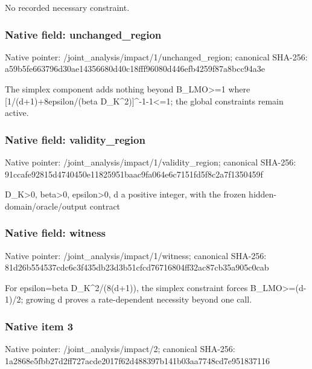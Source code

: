\documentclass[10pt,a4paper]{article}
\begin{document}
\begingroup\raggedright\sloppy No recorded necessary constraint.\par\endgroup

\subsubsection{Native field: unchanged\_\allowbreak{}region}
Native pointer: /joint\_\allowbreak{}analysis/impact/1/unchanged\_\allowbreak{}region; canonical SHA-256: a59b5fe663796d30ae14356680d40c18fff96080d446efb4259f87a8bcc94a3e

\begingroup\raggedright\sloppy The simplex component adds nothing beyond B\_\allowbreak{}LMO>=\allowbreak{}1 where [1/\allowbreak{}(d+1)+8epsilon/\allowbreak{}(beta D\_\allowbreak{}K\textasciicircum{}2)]\textasciicircum{}-1-1<=\allowbreak{}1;\allowbreak{} the global constraints remain active.\par\endgroup

\subsubsection{Native field: validity\_\allowbreak{}region}
Native pointer: /joint\_\allowbreak{}analysis/impact/1/validity\_\allowbreak{}region; canonical SHA-256: 91ccafe92815d4740450e11825951baac9fa064e6c7151fd5f8c2a7f1350459f

\begingroup\raggedright\sloppy D\_\allowbreak{}K>0,\allowbreak{} beta>0,\allowbreak{} epsilon>0,\allowbreak{} d a positive integer,\allowbreak{} with the frozen hidden-domain/\allowbreak{}oracle/\allowbreak{}output contract\par\endgroup

\subsubsection{Native field: witness}
Native pointer: /joint\_\allowbreak{}analysis/impact/1/witness; canonical SHA-256: 81d26b554537cdc6c3f435db23d3b51cfcd76716804ff32ac87cb35a905c0cab

\begingroup\raggedright\sloppy For epsilon=\allowbreak{}beta D\_\allowbreak{}K\textasciicircum{}2/\allowbreak{}(8(d+1)),\allowbreak{} the simplex constraint forces B\_\allowbreak{}LMO>=\allowbreak{}(d-1)/\allowbreak{}2;\allowbreak{} growing d proves a rate-dependent necessity beyond one call.\par\endgroup

\subsubsection{Native item 3}
Native pointer: /joint\_\allowbreak{}analysis/impact/2; canonical SHA-256: 1a2868e5fbb27d2ff727acde2017f62d488397b141b03aa7748cd7e951837116
\end{document}
